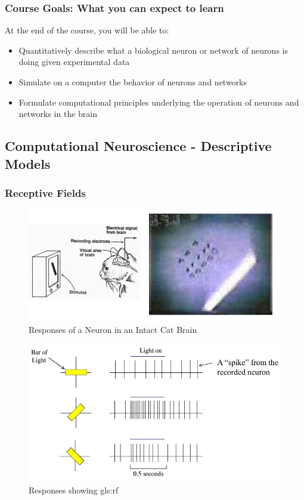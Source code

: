 \documentclass[]{article}
\begin{document}
\subsubsection{Course Goals: What you can expect to learn}
At the end of the course, you will be able to:
\begin{itemize}
	\item  Quantitatively describe what a biological neuron or
network of neurons is doing given experimental data
 \item Simulate on a computer the behavior of neurons and
networks
 \item Formulate computational principles underlying the
operation of neurons and networks in the brain
\end{itemize}

\subsection{Computational Neuroscience - Descriptive Models}

\subsubsection{Receptive Fields}
\begin{figure}[H]
	\caption[Responses of a Neuron in an Intact Cat Brain]{Responses of a Neuron in an Intact Cat Brain\cite{hubel1965receptive}}
	\includegraphics[width=\textwidth]{receptive-field-cat}
\end{figure}

\begin{figure}[H]
	\caption{Responses showing \gls{gls:rf}}
	\includegraphics[width=\textwidth]{receptive-field-cat-bars}
\end{figure}
\end{document}
